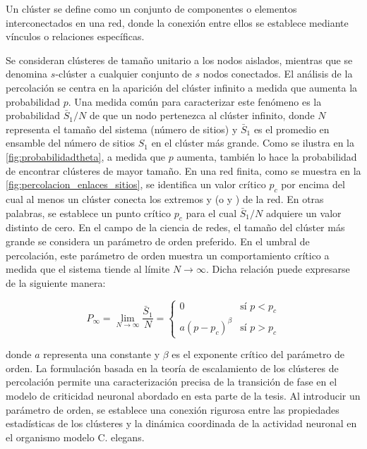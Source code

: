  
\begin{definition}[clúster] %
Un clúster se define como  un conjunto de componentes o elementos interconectados en una red, donde la conexión entre ellos se establece mediante vínculos o relaciones específicas.
\end{definition}

Se consideran clústeres de tamaño unitario a los nodos aislados, mientras que se denomina $s$-clúster a cualquier conjunto de $s$ nodos conectados. El análisis de la percolación se centra en la aparición del clúster infinito a medida que aumenta la probabilidad $p$. Una medida común para caracterizar este fenómeno es la probabilidad $\bar{S}_1/N$ de que un nodo pertenezca al clúster infinito, donde $N$ representa el tamaño del sistema (número de sitios) y $\bar{S}_1$ es el promedio en ensamble del número de sitios $S_1$ en el clúster más grande.  Como se ilustra en la \cref{fig:probabilidadtheta}, a medida que $p$ aumenta, también lo hace la probabilidad de encontrar clústeres de mayor tamaño. En una red finita, como se muestra en la \cref{fig:percolacion_enlaces_sitios}, se identifica un valor crítico $p_c$ por encima del cual al menos un clúster conecta los extremos  y  (o  y ) de la red. En otras palabras, se establece un punto crítico $p_c$ para el cual $\bar{S}_1/N$ adquiere un valor distinto de cero. En el campo de la ciencia de redes, el tamaño del clúster más grande se considera un parámetro de orden preferido. En el umbral de percolación, este parámetro de orden muestra un comportamiento crítico a medida que el sistema tiende al límite $N \to\infty$. Dicha relación puede expresarse de la siguiente manera:

\begin{equation}\label{eq:5}
	P_\infty = \lim_{N\to\infty} \frac{\bar{S}_1}{N} =  \begin{cases}
		0 & \text{sí } p<p_c\\
		a\left(p-p_c\right)^\beta & \text{sí } p>p_c
	\end{cases}
\end{equation}

donde $a$ representa una constante y $\beta$ es el exponente crítico del parámetro de orden. La formulación basada en la teoría de escalamiento de los clústeres de percolación permite una caracterización precisa de la transición de fase en el modelo de criticidad neuronal abordado en esta parte de la tesis. Al introducir un parámetro de orden, se establece una conexión rigurosa entre las propiedades estadísticas de los clústeres y la dinámica coordinada de la actividad neuronal en el organismo modelo C. elegans. 


